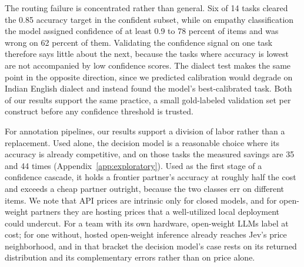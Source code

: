 \documentclass[11pt]{article}
\begin{document}
The routing failure is concentrated rather than general. Six of 14 tasks cleared the 0.85 accuracy target in the confident subset, while on empathy classification the model assigned confidence of at least 0.9 to 78 percent of items and was wrong on 62 percent of them. Validating the confidence signal on one task therefore says little about the next, because the tasks where accuracy is lowest are not accompanied by low confidence scores. The dialect test makes the same point in the opposite direction, since we predicted calibration would degrade on Indian English dialect and instead found the model's best-calibrated task. Both of our results support the same practice, a small gold-labeled validation set per construct before any confidence threshold is trusted.

For annotation pipelines, our results support a division of labor rather than a replacement. Used alone, the decision model is a reasonable choice where its accuracy is already competitive, and on those tasks the measured savings are 35 and 44 times (Appendix~\ref{app:exploratory}). Used as the first stage of a confidence cascade, it holds a frontier partner's accuracy at roughly half the cost and exceeds a cheap partner outright, because the two classes err on different items. We note that API prices are intrinsic only for closed models, and for open-weight partners they are hosting prices that a well-utilized local deployment could undercut. For a team with its own hardware, open-weight LLMs label at cost; for one without, hosted open-weight inference already reaches Jev's price neighborhood, and in that bracket the decision model's case rests on its returned distribution and its complementary errors rather than on price alone.
\end{document}
